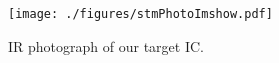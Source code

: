 
\begin{figure}[h]
	\texttt{[image: ./figures/stmPhotoImshow.pdf]}
	\caption{IR photograph of our target IC.}
	\label{stm_ir_photo}
\end{figure}
